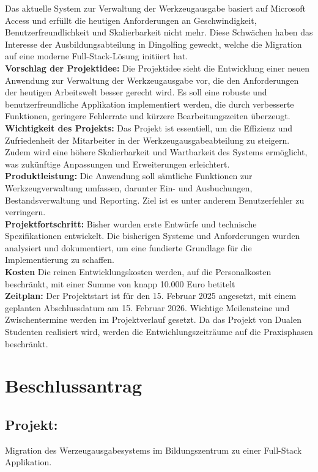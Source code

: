 \documentclass[a4paper, 12pt]{article}
\begin{document}
Das aktuelle System zur Verwaltung der Werkzeugausgabe basiert auf Microsoft Access und erfüllt die heutigen Anforderungen an Geschwindigkeit, Benutzerfreundlichkeit und Skalierbarkeit nicht mehr. Diese Schwächen haben das Interesse der Ausbildungsabteilung in Dingolfing geweckt, welche die Migration auf eine moderne Full-Stack-Lösung initiiert hat. \\
\textbf{Vorschlag der Projektidee:} Die Projektidee sieht die Entwicklung einer neuen Anwendung zur Verwaltung der Werkzeugausgabe vor, die den Anforderungen der heutigen Arbeitswelt besser gerecht wird. Es soll eine robuste und benutzerfreundliche Applikation implementiert werden, die durch verbesserte Funktionen, geringere Fehlerrate und kürzere Bearbeitungszeiten überzeugt. \\
\textbf{Wichtigkeit des Projekts:} Das Projekt ist essentiell, um die Effizienz und Zufriedenheit der Mitarbeiter in der Werkzeugausgabeabteilung zu steigern. Zudem wird eine höhere Skalierbarkeit und Wartbarkeit des Systems ermöglicht, was zukünftige Anpassungen und Erweiterungen erleichtert. \\
\textbf{Produktleistung:} Die Anwendung soll sämtliche Funktionen zur Werkzeugverwaltung umfassen, darunter Ein- und Ausbuchungen, Bestandsverwaltung und Reporting. Ziel ist es unter anderem Benutzerfehler zu verringern. \\
\textbf{Projektfortschritt:} Bisher wurden erste Entwürfe und technische Spezifikationen entwickelt. Die bisherigen Systeme und Anforderungen wurden analysiert und dokumentiert, um eine fundierte Grundlage für die Implementierung zu schaffen. \\
\textbf{Kosten} Die reinen Entwicklungskosten werden, auf die Personalkosten beschränkt, mit einer Summe von knapp 10.000 Euro betitelt \\
\textbf{Zeitplan:} Der Projektstart ist für den 15. Februar 2025 angesetzt, mit einem geplanten Abschlussdatum am 15. Februar 2026. Wichtige Meilensteine und Zwischentermine werden im Projektverlauf gesetzt. Da das Projekt von Dualen Studenten realisiert wird, werden die Entwichlungszeiträume auf die Praxisphasen beschränkt.

\newpage


\section{Beschlussantrag}

\subsection*{Projekt:} 
Migration des Werzeugausgabesystems im Bildungszentrum zu einer Full-Stack Applikation.
\end{document}
